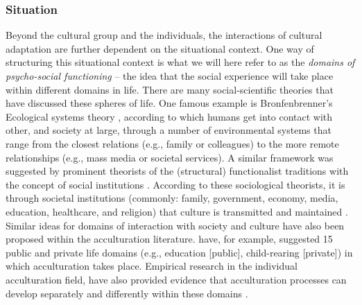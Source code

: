 \documentclass[man, 12pt, a4paper]{apa7}
\begin{document}
\subsubsection{Situation} 
Beyond the cultural group and the individuals, the interactions of cultural adaptation are further dependent on the situational context. One way of structuring this situational context is what we will here refer to as the \textit{domains of psycho-social functioning} -- the idea that the social experience will take place within different domains in life. There are many social-scientific theories that have discussed these spheres of life. One famous example is Bronfenbrenner's Ecological systems theory \citep{Bronfenbrenner1992}, according to which humans get into contact with other, and society at large, through a number of environmental systems that range from the closest relations (e.g., family or colleagues) to the more remote relationships (e.g., mass media or societal services). A similar framework was suggested by prominent theorists of the (structural) functionalist traditions with the concept of social institutions \citep[e.g.,][]{Turner1997}. According to these sociological theorists, it is through societal institutions (commonly: family, government, economy, media, education, healthcare, and religion) that culture is transmitted and maintained \citep[e.g.,][]{Durkheim1982}. Similar ideas for domains of interaction with society and culture have also been proposed within the acculturation literature. \citet{Arends-Toth2006, Arends-Toth2007} have, for example, suggested 15 public and private life domains (e.g., education [public], child-rearing [private]) in which acculturation takes place. Empirical research in the individual acculturation field, have also provided evidence that acculturation processes can develop separately and differently within these domains \citep[e.g.,][]{Arends-Toth2003a}. 
\end{document}
